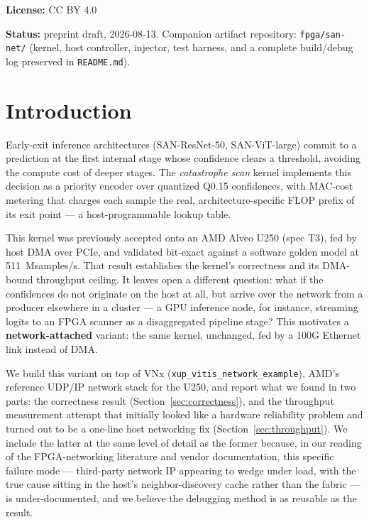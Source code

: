 \documentclass[11pt,a4paper]{article}
\newcommand{\code}[1]{\texttt{#1}}
\begin{document}
\noindent\textbf{License:} CC BY 4.0

\noindent\textbf{Status:} preprint draft, 2026-08-13. Companion artifact
repository: \code{fpga/san-net/} (kernel, host controller, injector, test
harness, and a complete build/debug log preserved in \code{README.md}).

\section{Introduction}

Early-exit inference architectures (SAN-ResNet-50, SAN-ViT-large) commit
to a prediction at the first internal stage whose confidence clears a
threshold, avoiding the compute cost of deeper stages. The
\emph{catastrophe scan} kernel implements this decision as a priority
encoder over quantized Q0.15 confidences, with MAC-cost metering that
charges each sample the real, architecture-specific FLOP prefix of its
exit point --- a host-programmable lookup table.

This kernel was previously accepted onto an AMD Alveo U250 (spec T3), fed
by host DMA over PCIe, and validated bit-exact against a software golden
model at 511~Msamples/s. That result establishes the kernel's
correctness and its DMA-bound throughput ceiling. It leaves open a
different question: what if the confidences do not originate on the host
at all, but arrive over the network from a producer elsewhere in a
cluster --- a GPU inference node, for instance, streaming logits to an
FPGA scanner as a disaggregated pipeline stage? This motivates a
\textbf{network-attached} variant: the same kernel, unchanged, fed by a
100G Ethernet link instead of DMA.

We build this variant on top of VNx (\code{xup\_vitis\_network\_example}),
AMD's reference UDP/IP network stack for the U250, and report what we
found in two parts: the correctness result (Section~\ref{sec:correctness}),
and the throughput measurement attempt that initially looked like a
hardware reliability problem and turned out to be a one-line host
networking fix (Section~\ref{sec:throughput}). We include the latter at
the same level of detail as the former because, in our reading of the
FPGA-networking literature and vendor documentation, this specific
failure mode --- third-party network IP appearing to wedge under load,
with the true cause sitting in the host's neighbor-discovery cache
rather than the fabric --- is under-documented, and we believe the
debugging method is as reusable as the result.
\end{document}

